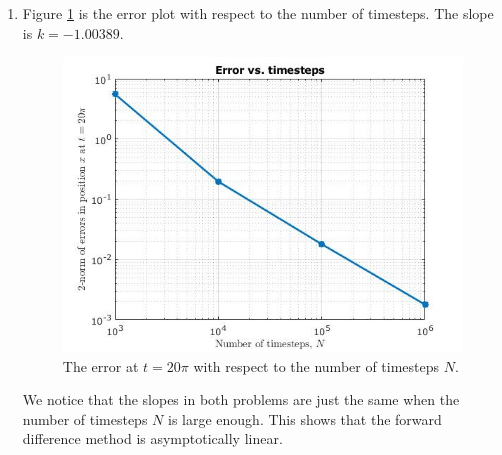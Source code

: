 \documentclass{article}
\begin{document}
\begin{enumerate}
\begin{enumerate}
\item
Figure \ref{problem 2.2} is the error plot with respect to the number of timesteps. The slope is $k = -1.00389$.
\begin{figure}[h]
\centering
\vbox{
\includegraphics[scale=0.6]{problem2/error.jpg}
}
\caption{The error at $t = 20\pi$ with respect to the number of timesteps $N$.}
\label{problem 2.2}
\end{figure}

We notice that the slopes in both problems are just the same when the number of timesteps $N$ is large enough. This shows that the forward difference method is asymptotically linear.

\end{enumerate}

\end{enumerate}
\end{document}
